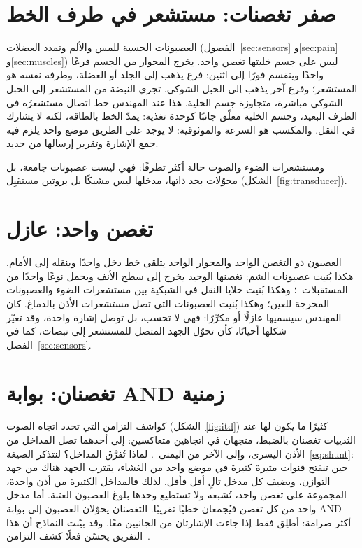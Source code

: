 \section{صفر تغصنات: مستشعر في طرف الخط}

العصبونات الحسية للمس والألم وتمدد العضلات (الفصول~\ref{sec:sensors} و\ref{sec:pain} و\ref{sec:muscles}) ليس على جسم خليتها تغصن واحد. يخرج المحوار من الجسم فرعًا واحدًا وينقسم فورًا إلى اثنين: فرع يذهب إلى الجلد أو العضلة، وطرفه نفسه هو المستشعر؛ وفرع آخر يذهب إلى الحبل الشوكي. تجري النبضة من المستشعر إلى الحبل الشوكي مباشرة، متجاوزة جسم الخلية. هذا عند المهندس خط اتصال مستشعرُه في الطرف البعيد، وجسم الخلية معلّق جانبًا كوحدة تغذية: يمدّ الخط بالطاقة، لكنه لا يشارك في النقل. والمكسب هو السرعة والموثوقية: لا يوجد على الطريق موضع واحد يلزم فيه جمع الإشارة وتقرير إرسالها من جديد.

ومستشعرات الضوء والصوت حالة أكثر تطرفًا: فهي ليست عصبونات جامعة، بل محوّلات بحد ذاتها، مدخلها ليس مشبكًا بل بروتين مستقبِل (الشكل~\ref{fig:transducer}).

\section{تغصن واحد: عازل}

العصبون ذو التغصن الواحد والمحوار الواحد يتلقى خط دخل واحدًا وينقله إلى الأمام. هكذا بُنيت عصبونات الشم: تغصنها الوحيد يخرج إلى سطح الأنف ويحمل نوعًا واحدًا من المستقبلات~\cite{Mombaerts2004}؛ وهكذا بُنيت خلايا النقل في الشبكية بين مستشعرات الضوء والعصبونات المخرجة للعين؛ وهكذا بُنيت العصبونات التي تصل مستشعرات الأذن بالدماغ. كان المهندس سيسميها عازلًا أو مكرِّرًا: فهي لا تحسب، بل توصل إشارة واحدة، وقد تغيّر شكلها أحيانًا، كأن تحوّل الجهد المتصل للمستشعر إلى نبضات، كما في الفصل~\ref{sec:sensors}.

\section{تغصنان: بوابة AND زمنية}

كواشف التزامن التي تحدد اتجاه الصوت (الشكل~\ref{fig:itd}) كثيرًا ما يكون لها عند الثدييات تغصنان بالضبط، متجهان في اتجاهين متعاكسين: إلى أحدهما تصل المداخل من الأذن اليسرى، وإلى الآخر من اليمنى~\cite{Grothe2010}. لماذا تُفرَّق المداخل؟ لنتذكر الصيغة~\eqref{eq:shunt}: حين تنفتح قنوات مثيرة كثيرة في موضع واحد من الغشاء، يقترب الجهد هناك من جهد التوازن، ويضيف كل مدخل تالٍ أقل فأقل. لذلك فالمداخل الكثيرة من أذن واحدة، المجموعة على تغصن واحد، تُشبعه ولا تستطيع وحدها بلوغ العصبون العتبة. أما مدخل واحد من كل تغصن فيُجمعان خطيًا تقريبًا. التغصنان يحوّلان العصبون إلى بوابة AND أكثر صرامة: أطلِق فقط إذا جاءت الإشارتان من الجانبين معًا. وقد بيّنت النماذج أن هذا التفريق يحسّن فعلًا كشف التزامن~\cite{AgmonSnir1998}.

